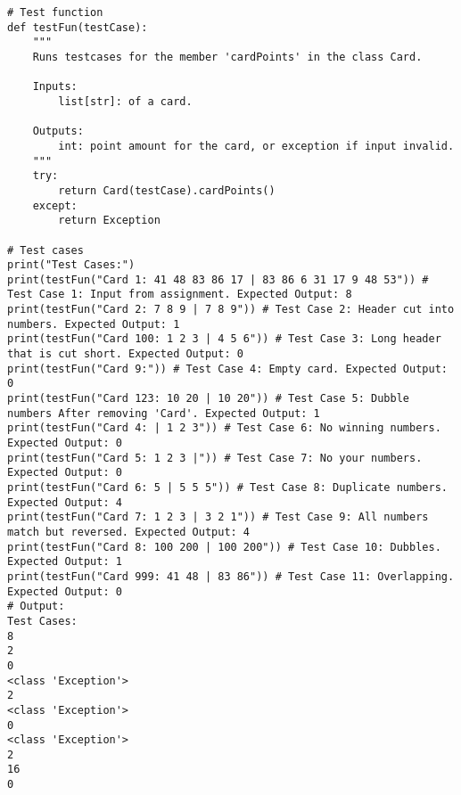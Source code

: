 \documentclass[a4paper,12pt]{article}
\begin{document}
\begin{lstlisting}
# Test function
def testFun(testCase):
    """
    Runs testcases for the member 'cardPoints' in the class Card.
    
    Inputs:
        list[str]: of a card.
        
    Outputs:
        int: point amount for the card, or exception if input invalid.
    """
    try:
        return Card(testCase).cardPoints()
    except:
        return Exception
    
# Test cases
print("Test Cases:")
print(testFun("Card 1: 41 48 83 86 17 | 83 86 6 31 17 9 48 53")) # Test Case 1: Input from assignment. Expected Output: 8
print(testFun("Card 2: 7 8 9 | 7 8 9")) # Test Case 2: Header cut into numbers. Expected Output: 1
print(testFun("Card 100: 1 2 3 | 4 5 6")) # Test Case 3: Long header that is cut short. Expected Output: 0
print(testFun("Card 9:")) # Test Case 4: Empty card. Expected Output: 0
print(testFun("Card 123: 10 20 | 10 20")) # Test Case 5: Dubble numbers After removing 'Card'. Expected Output: 1
print(testFun("Card 4: | 1 2 3")) # Test Case 6: No winning numbers. Expected Output: 0
print(testFun("Card 5: 1 2 3 |")) # Test Case 7: No your numbers. Expected Output: 0
print(testFun("Card 6: 5 | 5 5 5")) # Test Case 8: Duplicate numbers. Expected Output: 4
print(testFun("Card 7: 1 2 3 | 3 2 1")) # Test Case 9: All numbers match but reversed. Expected Output: 4
print(testFun("Card 8: 100 200 | 100 200")) # Test Case 10: Dubbles. Expected Output: 1
print(testFun("Card 999: 41 48 | 83 86")) # Test Case 11: Overlapping. Expected Output: 0
# Output:
Test Cases:
8
2
0
<class 'Exception'>
2
<class 'Exception'>
0
<class 'Exception'>
2
16
0
\end{lstlisting}
\end{document}
